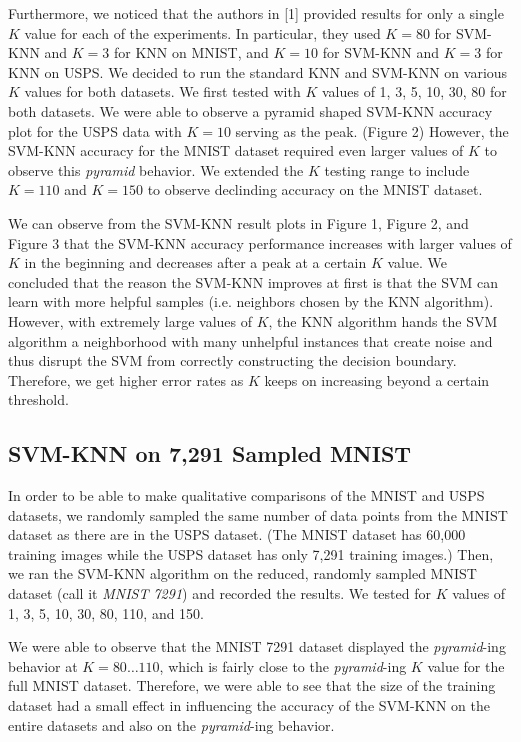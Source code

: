 \documentclass[11pt,letterpaper]{article}
\begin{document}
Furthermore, we noticed that the authors in [1] provided results for only a single $K$ value for each of the experiments. In particular, they used $K=80$ for SVM-KNN and $K=3$ for KNN on MNIST,  and $K=10$ for SVM-KNN and $K=3$ for KNN on USPS. We decided to run the standard KNN and SVM-KNN on various $K$ values for both datasets. We first tested with $K$ values of 1, 3, 5, 10, 30, 80 for both datasets. We were able to observe a pyramid shaped SVM-KNN accuracy plot for the USPS data with $K=10$ serving as the peak. (Figure 2) However, the SVM-KNN accuracy for the MNIST dataset required even larger values of $K$ to observe this \textit{pyramid} behavior. We extended the $K$ testing range to include $K=110$ and $K=150$ to observe declinding accuracy on the MNIST dataset.

We can observe from the SVM-KNN result plots in Figure 1, Figure 2, and Figure 3 that the SVM-KNN accuracy performance increases with larger values of $K$ in the beginning and decreases after a peak at a certain $K$ value. We concluded that the reason the SVM-KNN improves at first is that the SVM can learn with more helpful samples (i.e. neighbors chosen by the KNN algorithm). However, with extremely large values of $K$, the KNN algorithm hands the SVM algorithm a neighborhood with many unhelpful instances that create noise and thus disrupt the SVM from correctly constructing the decision boundary. Therefore, we get higher error rates as $K$ keeps on increasing beyond a certain threshold.
 
\subsection{SVM-KNN on 7,291 Sampled MNIST}

In order to be able to make qualitative comparisons of the MNIST and USPS datasets, we randomly sampled the same number of data points from the MNIST dataset as there are in the USPS dataset. (The MNIST dataset has 60,000 training images while the USPS dataset has only 7,291 training images.) Then, we ran the SVM-KNN algorithm on the reduced, randomly sampled MNIST dataset (call it \textit{MNIST 7291}) and recorded the results. We tested for $K$ values of 1, 3, 5, 10, 30, 80, 110, and 150.

We were able to observe that the MNIST 7291 dataset displayed the \textit{pyramid}-ing behavior at $K=80\dots 110$, which is fairly close to the \textit{pyramid}-ing $K$ value for the full MNIST dataset. Therefore, we were able to see that the size of the training dataset had a small effect in influencing the accuracy of the SVM-KNN on the entire datasets and also on the \textit{pyramid}-ing behavior.
\end{document}
